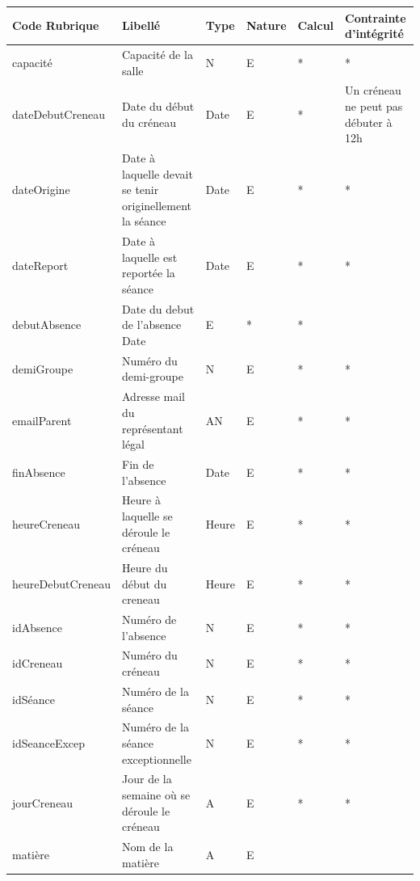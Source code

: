 \documentclass[12pt,french,titlepage]{article}
\begin{document}
	  \begin{tabular}{p{4cm}|p{3cm}|p{1cm}|p{1cm}|p{1cm}|p{2cm}}
	      Code Rubrique & Libellé & Type &Nature & Calcul & Contrainte d'intégrité \\ \hline
	      \hline
	       capacité	& Capacité de la salle &	N &	E	& * & *	\\ \hline 
dateDebutCreneau &	Date du début du créneau &	Date &	E & * &		Un créneau ne peut pas débuter à 12h\\ \hline
dateOrigine &	Date à laquelle devait se tenir originellement la séance &	Date &	E & * & *\\ \hline	
dateReport &	Date à laquelle est reportée la séance &	Date &	E & * &*		\\ \hline
debutAbsence &	Date du debut de l'absence	Date &	E &	* & *	\\ \hline
demiGroupe	& Numéro du demi-groupe &	N &	E & * & *		\\ \hline
emailParent &	Adresse mail du représentant légal & AN &	E & * & *	\\ \hline	
finAbsence &	Fin de l'absence &	Date &	E & * & * 	\\ \hline
heureCreneau &	Heure à laquelle se déroule le créneau &	Heure &	E & * & *	\\ \hline	
heureDebutCreneau &	Heure du début du creneau &	Heure &	E & * & *	\\ \hline	
idAbsence &	Numéro de l'absence &	N &	E & * & *		\\ \hline
idCreneau &	Numéro du créneau &	N &	E & * & *		\\ \hline
idSéance &	Numéro de la séance	& N &	E & * & *		\\ \hline
idSeanceExcep	& Numéro de la séance exceptionnelle &	N &	E & * & *	\\ \hline	
jourCreneau	& Jour de la semaine où se déroule le créneau &	A &	E & * & *	\\ \hline	
matière	& Nom de la matière	& A &	E &  & 	\\ \hline

	  \end{tabular}
	  
\end{document}
